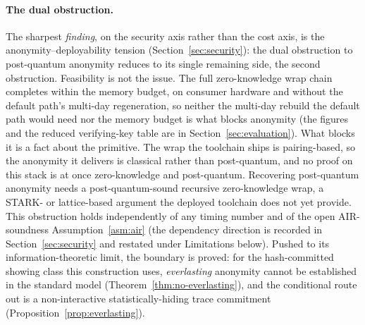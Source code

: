 \paragraph{The dual obstruction.}
The sharpest \emph{finding}, on the security axis rather than the cost axis, is the anonymity--deployability tension (Section~\ref{sec:security}): the dual obstruction to post-quantum anonymity reduces to its single remaining side, the second obstruction. Feasibility is not the issue. The full zero-knowledge wrap chain completes within the memory budget, on consumer hardware and without the default path's multi-day regeneration, so neither the multi-day rebuild the default path would need nor the memory budget is what blocks anonymity (the figures and the reduced verifying-key table are in Section~\ref{sec:evaluation}). What blocks it is a fact about the primitive. The wrap the toolchain ships is pairing-based, so the anonymity it delivers is classical rather than post-quantum, and no proof on this stack is at once zero-knowledge and post-quantum. Recovering post-quantum anonymity needs a post-quantum-sound recursive zero-knowledge wrap, a {STARK}- or lattice-based argument the deployed toolchain does not yet provide. This obstruction holds independently of any timing number and of the open AIR-soundness Assumption~\ref{asm:air} (the dependency direction is recorded in Section~\ref{sec:security} and restated under Limitations below). Pushed to its information-theoretic limit, the boundary is proved: for the hash-committed showing class this construction uses, \emph{everlasting} anonymity cannot be established in the standard model (Theorem~\ref{thm:no-everlasting}), and the conditional route out is a non-interactive statistically-hiding trace commitment (Proposition~\ref{prop:everlasting}).

